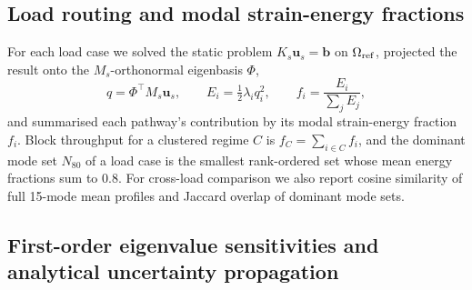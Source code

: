 \documentclass[11pt]{article}
\begin{document}
\subsection{Load routing and modal strain-energy fractions}
\label{sec:routing-methods}

For each load case we solved the static problem $K_s\mathbf u_s=\mathbf b$ on $\Omega_{\rm ref}$, projected the result onto the $M_s$-orthonormal eigenbasis $\Phi$,
\begin{equation}
q=\Phi^\top M_s\mathbf u_s,\qquad E_i=\tfrac12\lambda_i q_i^2,\qquad f_i=\frac{E_i}{\sum_j E_j},
\label{eq:modal-fraction}
\end{equation}
and summarised each pathway's contribution by its modal strain-energy fraction $f_i$.
Block throughput for a clustered regime $C$ is $f_C=\sum_{i\in C}f_i$, and the dominant mode set $N_{80}$ of a load case is the smallest rank-ordered set whose mean energy fractions sum to 0.8.
For cross-load comparison we also report cosine similarity of full 15-mode mean profiles and Jaccard overlap of dominant mode sets.

\subsection{First-order eigenvalue sensitivities and analytical uncertainty propagation}
\label{sec:sensitivities}
\end{document}
